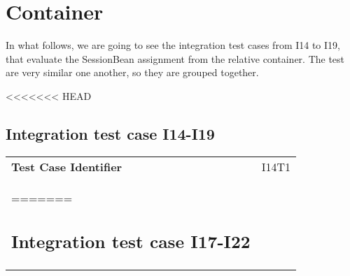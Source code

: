 \section{Container}

In what follows, we are going to see the integration test cases from I14 to I19, that evaluate the SessionBean assignment from the relative container. The test are very similar one another, so they are grouped together.

<<<<<<< HEAD
\subsection{Integration test case I14-I19}

\begin{tabular}{l p{}}
    \hline
    \textbf{Test Case Identifier} & I14T1\\
=======
\subsection{Integration test case I17-I22}


\end{tabular}
